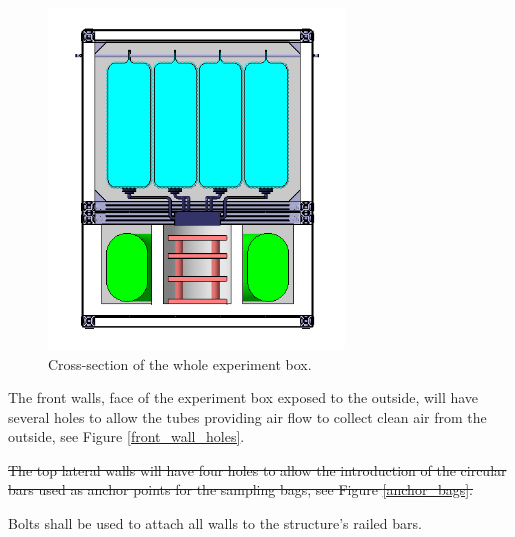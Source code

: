\documentclass[a4paper,12pt,twoside]{article}
\providecommand{\DIFdeltex}[1]{{\protect\color{red}\sout{#1}}}                      %
\providecommand{\DIFdelbegin}{} %
\providecommand{\DIFdelend}{} %
\providecommand{\DIFdel}[1]{\texorpdfstring{\DIFdeltex{#1}}{}} %
\newcommand{\DIFscaledelfig}{0.5}
\newlength{\DIFdelgraphicswidth} %
\newlength{\DIFdelgraphicsheight} %
\newcommand{\DIFdelincludegraphics}[2][]{%
\sbox{\DIFdelgraphicsbox}{\DIFOincludegraphics[#1]{#2}}%
\settoboxwidth{\DIFdelgraphicswidth}{\DIFdelgraphicsbox} %
\settoboxtotalheight{\DIFdelgraphicsheight}{\DIFdelgraphicsbox} %
\scalebox{\DIFscaledelfig}{%
\parbox[b]{\DIFdelgraphicswidth}{\usebox{\DIFdelgraphicsbox}\\[-\baselineskip] \rule{\DIFdelgraphicswidth}{0em}}\llap{\resizebox{\DIFdelgraphicswidth}{\DIFdelgraphicsheight}{%
\setlength{\unitlength}{\DIFdelgraphicswidth}%
\begin{picture}(1,1)%
\thicklines\linethickness{2pt} %
{\color[rgb]{1,0,0}\put(0,0){\framebox(1,1){}}}%
{\color[rgb]{1,0,0}\put(0,0){\line( 1,1){1}}}%
{\color[rgb]{1,0,0}\put(0,1){\line(1,-1){1}}}%
\end{picture}%
}\hspace*{3pt}}} %
} %
\DeclareRobustCommand{\DIFdelbegin}{\DIFOdelbegin \let\includegraphics\DIFdelincludegraphics} %
\DeclareRobustCommand{\DIFdelend}{\DIFOaddend \let\includegraphics\DIFOincludegraphics} %
\begin{document}

\begin{figure}[!ht]
    \centering
    \includegraphics[width=0.7\textwidth]{4-experiment-design/img/tall_frontal.jpg}
    \caption{Cross-section of the whole experiment box.}
    \label{cut_all}
\end{figure}

The front walls, face of the experiment box exposed to the outside, will have several holes to allow the tubes providing air flow to collect clean air from the outside, see Figure \ref{front_wall_holes}.

\DIFdelbegin \DIFdel{The top lateral walls will have four holes to allow the introduction of the circular bars used as anchor points for the sampling bags, see Figure \ref{anchor_bags}.
}\DIFdelend %

Bolts shall be used to attach all walls to the structure's railed bars.

\end{document}
